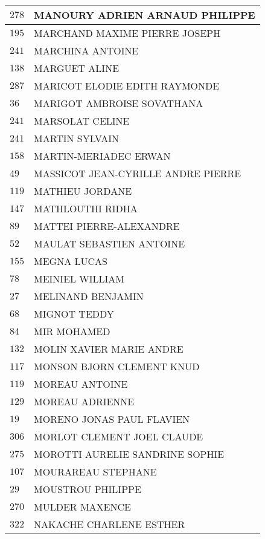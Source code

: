 \begin{xltabular}{\linewidth}{|l|X|}
    \hline
    $278$ & MANOURY ADRIEN ARNAUD PHILIPPE \\
    \hline
    $195$ & MARCHAND MAXIME PIERRE JOSEPH \\
    \hline
    $241$ & MARCHINA ANTOINE \\
    \hline
    $138$ & MARGUET ALINE \\
    \hline
    $287$ & MARICOT ELODIE EDITH RAYMONDE \\
    \hline
    $36$ & MARIGOT AMBROISE SOVATHANA \\
    \hline
    $241$ & MARSOLAT CELINE \\
    \hline
    $241$ & MARTIN SYLVAIN \\
    \hline
    $158$ & MARTIN-MERIADEC ERWAN \\
    \hline
    $49$ & MASSICOT JEAN-CYRILLE ANDRE PIERRE \\
    \hline
    $119$ & MATHIEU JORDANE \\
    \hline
    $147$ & MATHLOUTHI RIDHA \\
    \hline
    $89$ & MATTEI PIERRE-ALEXANDRE \\
    \hline
    $52$ & MAULAT SEBASTIEN ANTOINE \\
    \hline
    $155$ & MEGNA LUCAS \\
    \hline
    $78$ & MEINIEL WILLIAM \\
    \hline
    $27$ & MELINAND BENJAMIN \\
    \hline
    $68$ & MIGNOT TEDDY \\
    \hline
    $84$ & MIR MOHAMED \\
    \hline
    $132$ & MOLIN XAVIER MARIE ANDRE \\
    \hline
    $117$ & MONSON BJORN CLEMENT KNUD \\
    \hline
    $119$ & MOREAU ANTOINE \\
    \hline
    $129$ & MOREAU ADRIENNE \\
    \hline
    $19$ & MORENO JONAS PAUL FLAVIEN \\
    \hline
    $306$ & MORLOT CLEMENT JOEL CLAUDE \\
    \hline
    $275$ & MOROTTI AURELIE SANDRINE SOPHIE \\
    \hline
    $107$ & MOURAREAU STEPHANE \\
    \hline
    $29$ & MOUSTROU PHILIPPE \\
    \hline
    $270$ & MULDER MAXENCE \\
    \hline
    $322$ & NAKACHE CHARLENE ESTHER \\

\end{xltabular}

